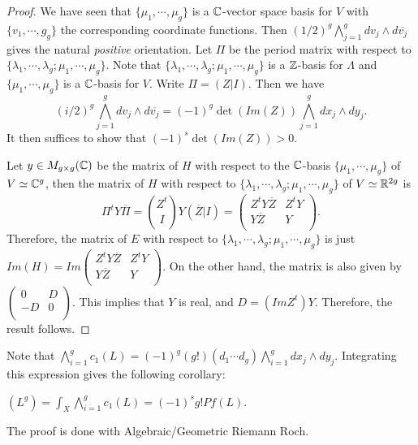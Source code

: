 \begin{proof}
We have seen that $\{\mu_1,\cdots, \mu_g\}$ is a ${\mathbb C}$-vector space basis for $V$ with $\{v_1,\cdots,g_g\}$ the corresponding coordinate functions. Then $(1/2)^g \bigwedge_{j=1}^g dv_j\wedge d\overline{v_j}$ gives the natural \emph{positive} orientation. Let $\Pi$ be the period matrix with respect to $\{\lambda_1,\cdots, \lambda_g; \mu_1,\cdots, \mu_g\}$. Note that $\{\lambda_1,\cdots, \lambda_g; \mu_1,\cdots, \mu_g\}$ is a ${\mathbb Z}$-basis for $\Lambda$ and $\{\mu_1,\cdots,\mu_g\}$ is a ${\mathbb C}$-basis for $V$. Write $\Pi=(Z|I)$. Then we have 
$$(i/2)^g \bigwedge_{j=1}^g dv_j\wedge d\overline{v_j} = (-1)^g \det(Im(Z))\bigwedge_{j=1}^g dx_j\wedge dy_j.$$
It then suffices to show that $(-1)^s\det(Im(Z))>0$. 

Let $y\in M_{g\times g}({\mathbb C})$ be the matrix of $H$ with respect to the ${\mathbb C}$-basis $\{\mu_1,\cdots, \mu_g\}$ of $V\simeq {\mathbb C}^g$, then the matrix of $H$ with respect to $\{\lambda_1,\cdots, \lambda_g; \mu_1,\cdots, \mu_g\}$ of $V\simeq {\mathbb R}^{2g}$ is 
$$\Pi^t Y \overline{\Pi}=\binom{Z^t}{I}Y(\overline{Z}| I)=
\left(
\begin{array}{cc}
Z^t Y \overline{Z} & Z^t Y\\
Y\overline{Z} & Y\\
\end{array}
\right).$$ 
Therefore, the matrix of $E$ with respect to $\{\lambda_1,\cdots, \lambda_g; \mu_1,\cdots, \mu_g\}$ is just $Im(H)=Im \left(
\begin{array}{cc}
Z^t Y \overline{Z} & Z^t Y\\
Y\overline{Z} & Y\\
\end{array}
\right)$. On the other hand, the matrix is also given by $\left(
\begin{array}{cc}
0 & D\\
-D & 0\\
\end{array}
\right)$. This implies that $Y$ is real, and $D=(Im Z^t)Y$. Therefore, the result follows.
\end{proof}

Note that $\bigwedge_{i=1}^g c_1(L)=(-1)^g (g!)(d_1\cdots d_g)\bigwedge_{i=1}^g dx_j\wedge dy_j$. Integrating this expression gives the following corollary:

\begin{corollary}
$(L^g)=\int_X \bigwedge_{i=1}^g c_1(L)=(-1)^s g! Pf(L)$.
\end{corollary}

The proof is done with Algebraic/Geometric Riemann Roch.

